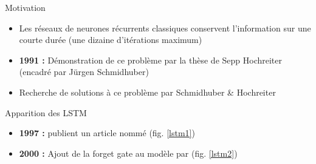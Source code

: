 \begin{frame}{Motivation}
    \begin{itemize}
        \item Les réseaux de neurones récurrents classiques conservent l'information sur une courte durée (une dizaine d'itérations maximum)
        \item \textbf{1991 :} Démonstration de ce problème par la thèse de Sepp Hochreiter (encadré par Jürgen Schmidhuber) \cite{Hochreiter91}
        \item Recherche de solutions à ce problème par Schmidhuber \& Hochreiter
    \end{itemize}
\end{frame}

\begin{frame}{Apparition des LSTM}
    \begin{itemize}
        \item \textbf{1997 :} \citeauthor{Hochreiter97} publient un article nommé \textit{} \cite{Hochreiter97} (fig. \ref{lstm1})
        \item \textbf{2000 :} Ajout de la \og forget gate\fg{} au modèle par \citeauthor{Gers00} \cite{Gers00} (fig. \ref{lstm2})
    \end{itemize}


\end{frame}
